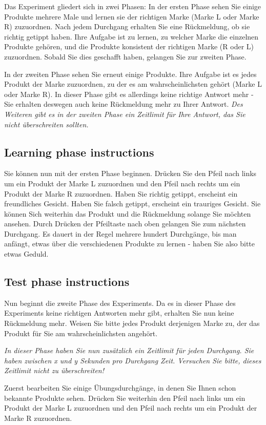 \documentclass[a4paper,man,natbib]{apa6}
\begin{document}
Das Experiment gliedert sich in zwei Phasen:
In der ersten Phase sehen Sie einige Produkte mehrere Male und lernen sie der richtigen Marke (Marke L oder Marke R) zuzuordnen. Nach jedem Durchgang erhalten Sie eine Rückmeldung, ob sie richtig getippt haben. Ihre Aufgabe ist zu lernen, zu welcher Marke die einzelnen Produkte gehören, und die Produkte konsistent der richtigen Marke (R oder L) zuzuordnen. Sobald Sie dies geschafft haben, gelangen Sie zur zweiten Phase.

In der zweiten Phase sehen Sie erneut einige Produkte. Ihre Aufgabe ist es jedes Produkt der Marke zuzuordnen, zu der es am wahrscheinlichsten gehört (Marke L oder Marke R). In dieser Phase gibt es allerdings keine richtige Antwort mehr - Sie erhalten deswegen auch keine Rückmeldung mehr zu Ihrer Antwort. \textit{Des Weiteren gibt es in der zweiten Phase ein Zeitlimit für Ihre Antwort, das Sie nicht überschreiten sollten.}

\subsection{Learning phase instructions}
Sie können nun mit der ersten Phase beginnen.
Drücken Sie den Pfeil nach links um ein Produkt der Marke L zuzuordnen und den Pfeil nach rechts um ein Produkt der Marke R zuzuordnen.
Haben Sie richtig getippt, erscheint ein freundliches Gesicht. Haben Sie falsch getippt, erscheint ein trauriges Gesicht.
Sie können Sich weiterhin das Produkt und die Rückmeldung solange Sie möchten ansehen.  Durch Drücken der Pfeiltaste nach oben gelangen Sie zum nächsten Durchgang.
Es dauert in der Regel mehrere hundert Durchgänge, bis man anfängt, etwas über die verschiedenen Produkte zu lernen - haben Sie also bitte etwas Geduld.

\subsection{Test phase instructions}
Nun beginnt die zweite Phase des Experiments.
Da es in dieser Phase des Experiments keine richtigen Antworten mehr gibt, erhalten Sie nun keine Rückmeldung mehr. Weisen Sie bitte jedes Produkt derjenigen Marke zu, der das Produkt für Sie am wahrscheinlichsten angehört.

\textit{In dieser Phase haben Sie nun zusätzlich ein Zeitlimit für jeden Durchgang.
Sie haben zwischen x und y Sekunden pro Durchgang Zeit.
Versuchen Sie bitte, dieses Zeitlimit nicht zu überschreiten!}

Zuerst bearbeiten Sie einige Übungsdurchgänge, in denen Sie Ihnen schon bekannte Produkte sehen.
Drücken Sie weiterhin den Pfeil nach links um ein Produkt der Marke L zuzuordnen und den Pfeil nach rechts um ein Produkt der Marke R zuzuordnen.
\end{document}
